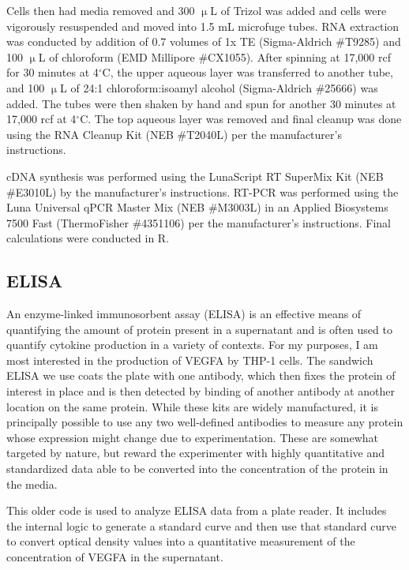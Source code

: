 Cells then had media removed and 300 $\upmu$L of Trizol was added and cells were vigorously resuspended and moved into 1.5 mL microfuge tubes. RNA extraction was conducted by addition of 0.7 volumes of 1x TE (Sigma\hyp{}Aldrich \#T9285) and 100 $\upmu$L of chloroform (EMD Millipore \#CX1055). After spinning at 17,000 rcf for 30 minutes at 4$^{\circ}$C, the upper aqueous layer was transferred to another tube, and 100 $\upmu$L of 24:1 chloroform:isoamyl alcohol (Sigma\hyp{}Aldrich \#25666) was added. The tubes were then shaken by hand and spun for another 30 minutes at 17,000 rcf at 4$^{\circ}$C. The top aqueous layer was removed and final cleanup was done using the RNA Cleanup Kit (NEB \#T2040L) per the manufacturer's instructions.

cDNA synthesis was performed using the LunaScript RT SuperMix Kit (NEB \#E3010L) by the manufacturer's instructions. RT\hyp{}PCR was performed using the Luna Universal qPCR Master Mix (NEB \#M3003L) in an Applied Biosystems 7500 Fast (ThermoFisher \#4351106) per the manufacturer's instructions. Final calculations were conducted in R. 

\subsection{ELISA}\label{elisa}

An enzyme\hyp{}linked immunosorbent assay (ELISA) is an effective means of quantifying the amount of protein present in a supernatant and is often used to quantify cytokine production in a variety of contexts. For my purposes, I am most interested in the production of VEGFA by THP\hyp{}1 cells. The sandwich ELISA we use coats the plate with one antibody, which then fixes the protein of interest in place and is then detected by binding of another antibody at another location on the same protein. While these kits are widely manufactured, it is principally possible to use any two well\hyp{}defined antibodies to measure any protein whose expression might change due to experimentation. These are somewhat targeted by nature, but reward the experimenter with highly quantitative and standardized data able to be converted into the concentration of the protein in the media.

\begin{code}
\caption{This older code is used to analyze ELISA data from a plate reader. It includes the internal logic to generate a standard curve and then use that standard curve to convert optical density values into a quantitative measurement of the concentration of VEGFA in the supernatant.}
\label{elisaanalysis}

\inputminted[breaklines,frame=single,fontsize=\small]{r}{source/ELISA_Analysis.R}

\end{code}

